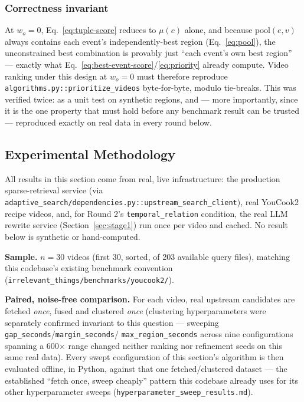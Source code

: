 \documentclass[11pt]{article}
\newcommand{\code}[1]{\texttt{\small #1}}
\newcommand{\file}[1]{\texttt{\footnotesize #1}}
\begin{document}
\subsubsection{Correctness invariant}
\label{sec:tuple-invariant}
At $w_o=0$, Eq.~\ref{eq:tuple-score} reduces to $\mu(c)$ alone, and because
$\mathrm{pool}(e,v)$ always contains each event's independently-best
region (Eq.~\ref{eq:pool}), the unconstrained best combination is provably
just ``each event's own best region'' --- exactly what
Eq.~\ref{eq:best-event-score}/\ref{eq:priority} already compute. Video
ranking under this design at $w_o=0$ must therefore reproduce
\file{algorithms.py::prioritize\_videos} byte-for-byte, modulo tie-breaks.
This was verified twice: as a unit test on synthetic regions, and --- more
importantly, since it is the one property that must hold before any
benchmark result can be trusted --- reproduced exactly on real data in every
round below.

\subsection{Experimental Methodology}
\label{sec:tuple-experiment}
All results in this section come from real, live infrastructure: the
production sparse-retrieval service (via
\file{adaptive\_search/dependencies.py::upstream\_search\_client}), real
YouCook2 recipe videos, and, for Round 2's \code{temporal\_relation}
condition, the real LLM rewrite service (Section~\ref{sec:stage1}) run once
per video and cached. No result below is synthetic or hand-computed.

\textbf{Sample.} $n=30$ videos (first 30, sorted, of 203 available query
files), matching this codebase's existing benchmark convention
(\file{irrelevant\_things/benchmarks/youcook2/}).

\textbf{Paired, noise-free comparison.} For each video, real upstream
candidates are fetched \emph{once}, fused and clustered \emph{once}
(clustering hyperparameters were separately confirmed invariant to this
question --- sweeping \code{gap\_seconds}/\code{margin\_seconds}/
\code{max\_region\_seconds} across nine configurations spanning a 600$\times$
range changed neither ranking nor refinement seeds on this same real data).
Every swept configuration of this section's algorithm is then evaluated
offline, in Python, against that one fetched/clustered dataset --- the
established ``fetch once, sweep cheaply'' pattern this codebase already
uses for its other hyperparameter sweeps
(\file{hyperparameter\_sweep\_results.md}).
\end{document}
